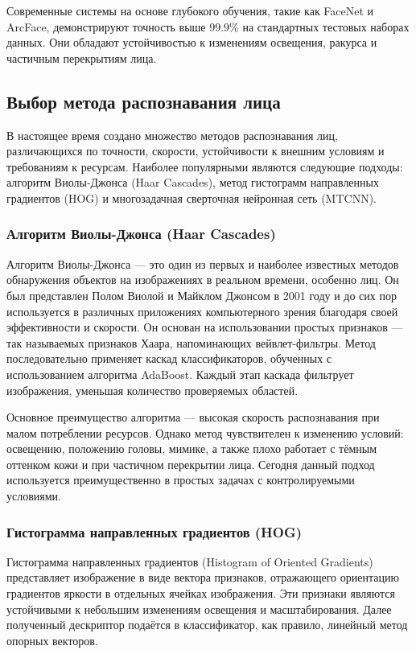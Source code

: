 Современные системы на основе глубокого обучения, такие как FaceNet и ArcFace, демонстрируют точность выше 99.9\% на стандартных тестовых наборах данных. Они обладают устойчивостью к изменениям освещения, ракурса и частичным перекрытиям лица\cite{history}.

\subsection{Выбор метода распознавания лица}

В настоящее время создано множество методов распознавания лиц, различающихся по точности, скорости, устойчивости к внешним условиям и требованиям к ресурсам. Наиболее популярными являются следующие подходы: алгоритм Виолы-Джонса (Haar Cascades), метод гистограмм направленных градиентов (HOG) и многозадачная сверточная нейронная сеть (MTCNN)\cite{four}.

\subsubsection{Алгоритм Виолы-Джонса (Haar Cascades)}
Алгоритм Виолы-Джонса — это один из первых и наиболее известных методов обнаружения объектов на изображениях в реальном времени, особенно лиц\cite{viola}. Он был представлен Полом Виолой и Майклом Джонсом в 2001 году и до сих пор используется в различных приложениях компьютерного зрения благодаря своей эффективности и скорости. Он основан на использовании простых признаков — так называемых признаков Хаара, напоминающих вейвлет-фильтры. Метод последовательно применяет каскад классификаторов, обученных с использованием алгоритма AdaBoost. Каждый этап каскада фильтрует изображения, уменьшая количество проверяемых областей.

Основное преимущество алгоритма — высокая скорость распознавания при малом потреблении ресурсов. Однако метод чувствителен к изменению условий: освещению, положению головы, мимике, а также плохо работает с тёмным оттенком кожи и при частичном перекрытии лица. Сегодня данный подход используется преимущественно в простых задачах с контролируемыми условиями.

\subsubsection{Гистограмма направленных градиентов (HOG)}
Гистограмма направленных градиентов (Histogram of Oriented Gradients) представляет изображение в виде вектора признаков, отражающего ориентацию градиентов яркости в отдельных ячейках изображения. Эти признаки являются устойчивыми к небольшим изменениям освещения и масштабирования. Далее полученный дескриптор подаётся в классификатор, как правило, линейный метод опорных векторов\cite{HOG}.

